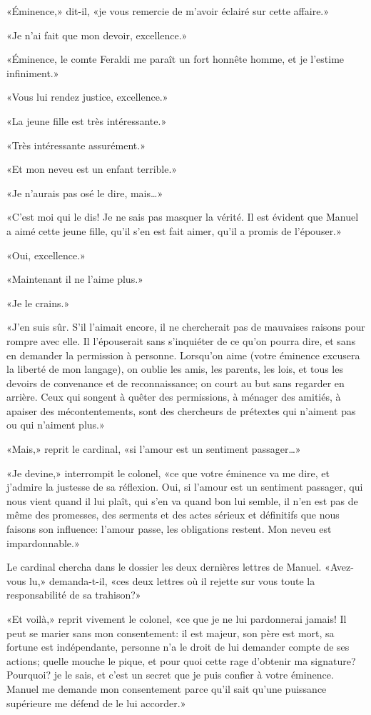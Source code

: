 «Éminence,» dit-il, «je vous remercie de m'avoir éclairé sur cette affaire.»

«Je n'ai fait que mon devoir, excellence.»

«Éminence, le comte Feraldi me paraît un fort honnête homme, et je l'estime infiniment.»

«Vous lui rendez justice, excellence.»

«La jeune fille est très intéressante.»

«Très intéressante assurément.»

«Et mon neveu est un enfant terrible.»

«Je n'aurais pas osé le dire, mais\ldots{}»

«C'est moi qui le dis! Je ne sais pas masquer la vérité. Il est évident que Manuel a aimé cette jeune fille, qu'il s'en est fait aimer, qu'il a promis de l'épouser.»

«Oui, excellence.»

«Maintenant il ne l'aime plus.»

«Je le crains.»

«J'en suis sûr. S'il l'aimait encore, il ne chercherait pas de mauvaises raisons pour rompre avec elle. Il l'épouserait sans s'inquiéter de ce qu'on pourra dire, et sans en demander la permission à personne. Lorsqu'on aime (votre éminence excusera la liberté de mon langage), on oublie les amis, les parents, les lois, et tous les devoirs de convenance et de reconnaissance; on court au but sans regarder en arrière. Ceux qui songent à quêter des permissions, à ménager des amitiés, à apaiser des mécontentements, sont des chercheurs de prétextes qui n'aiment pas ou qui n'aiment plus.»

«Mais,» reprit le cardinal, «si l'amour est un sentiment passager\ldots{}»

«Je devine,» interrompit le colonel, «ce que votre éminence va me dire, et j'admire la justesse de sa réflexion. Oui, si l'amour est un sentiment passager, qui nous vient quand il lui plaît, qui s'en va quand bon lui semble, il n'en est pas de même des promesses, des serments et des actes sérieux et définitifs que nous faisons son influence: l'amour passe, les obligations restent. Mon neveu est impardonnable.»

Le cardinal chercha dans le dossier les deux dernières lettres de Manuel. «Avez-vous lu,» demanda-t-il, «ces deux lettres où il rejette sur vous toute la responsabilité de sa trahison?»

«Et voilà,» reprit vivement le colonel, «ce que je ne lui pardonnerai jamais! Il peut se marier sans mon consentement: il est majeur, son père est mort, sa fortune est indépendante, personne n'a le droit de lui demander compte de ses actions; quelle mouche le pique, et pour quoi cette rage d'obtenir ma signature? Pourquoi? je le sais, et c'est un secret que je puis confier à votre éminence. Manuel me demande mon consentement parce qu'il sait qu'une puissance supérieure me défend de le lui accorder.»

